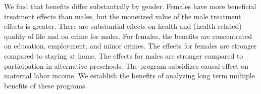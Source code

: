 We find that benefits differ substantially by gender. Females have more beneficial treatment effects than males, but the monetized value of the male treatment effects is greater. There are substantial effects on health and (health-related) quality of life and on crime for males. For females, the benefits are concentrated on education, employment, and minor crimes. The effects for females are stronger compared to staying at home. The effects for males are stronger compared to participation in alternative preschools. The program subsidizes causal effect on maternal labor income. We establish the benefits of analyzing long term multiple benefits of these programs.

\singlespace



 
